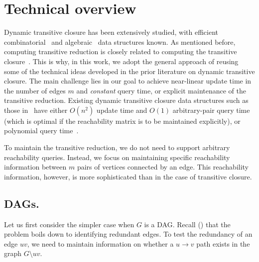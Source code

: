 \documentclass[11pt]{article}
\begin{document}
\section{Technical overview}\label{sec:overview}
Dynamic transitive closure has been extensively studied, with
efficient combinatorial~\cite{Roditty08, Roditty:2016aa} and algebraic~\cite{BrandNS19, Sankowski04} data structures known.
As mentioned before, computing  transitive reduction is closely
related to computing the transitive closure~\cite{Aho:1972aa}.
This is why, in this work, we adopt the general approach of reusing some of the technical ideas developed in the prior literature on dynamic transitive closure.
The main challenge lies in our goal to achieve near-linear update time in the number of edges $m$ and \emph{constant} query time,
or explicit maintenance of the transitive reduction.
Existing dynamic transitive closure data structures such as those in~\cite{Roditty08, Sankowski04}
have either $O(n^2)$ update time and $O(1)$ arbitrary-pair query time (which is optimal
if the reachability matrix is to be maintained explicitly),
or polynomial query time~\cite{BrandNS19, Roditty:2016aa, Sankowski04}.

To maintain the transitive reduction, we do not need to support arbitrary reachability queries. Instead, we focus on maintaining specific reachability information between $m$ pairs of vertices connected by an edge. This reachability information, however, is more sophisticated than in the case of transitive closure.

\subsection{DAGs.} Let us first consider the simpler case when $G$ is a DAG.
Recall () that the problem boils down to identifying redundant edges. To test the redundancy of an edge $uv$,
we need to maintain information on whether a $u\to v$ path exists in the graph $G\setminus uv$.
\end{document}

